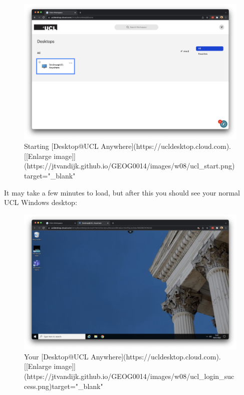 \documentclass[
]{book}
\begin{document}
\begin{figure}

{\centering \includegraphics[width=850pt]{images/w08/ucl_start} 

}

\caption{Starting [Desktop@UCL Anywhere](https://ucldesktop.cloud.com). [[Enlarge image]](https://jtvandijk.github.io/GEOG0014/images/w08/ucl_start.png){target="_blank"}}\label{fig:ucl-desktop-start}
\end{figure}

It may take a few minutes to load, but after this you should see your normal UCL Windows desktop:

\begin{figure}

{\centering \includegraphics[width=850pt]{images/w08/ucl_login_success} 

}

\caption{Your [Desktop@UCL Anywhere](https://ucldesktop.cloud.com). [[Enlarge image]](https://jtvandijk.github.io/GEOG0014/images/w08/ucl_login_success.png){target="_blank"}}\label{fig:ucl-desktop-login-success}
\end{figure}
\end{document}
